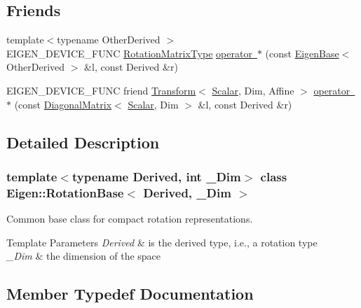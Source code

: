 \subsection*{Friends}
\begin{DoxyCompactItemize}
\item 
{\footnotesize template$<$typename Other\+Derived $>$ }\\E\+I\+G\+E\+N\+\_\+\+D\+E\+V\+I\+C\+E\+\_\+\+F\+U\+NC \mbox{\hyperlink{class_eigen_1_1_rotation_base_a83602509674c9d635551998460342951}{Rotation\+Matrix\+Type}} \mbox{\hyperlink{class_eigen_1_1_rotation_base_aa9a541f4a0b00b5463478c4973f7f112}{operator $\ast$}} (const \mbox{\hyperlink{struct_eigen_1_1_eigen_base}{Eigen\+Base}}$<$ Other\+Derived $>$ \&l, const Derived \&r)
\item 
E\+I\+G\+E\+N\+\_\+\+D\+E\+V\+I\+C\+E\+\_\+\+F\+U\+NC friend \mbox{\hyperlink{class_eigen_1_1_transform}{Transform}}$<$ \mbox{\hyperlink{class_eigen_1_1_rotation_base_af9b43eac462d7aa70b018efd49c13ef4}{Scalar}}, Dim, Affine $>$ \mbox{\hyperlink{class_eigen_1_1_rotation_base_a82017b7513e822b9adb8161abd1a9bbe}{operator $\ast$}} (const \mbox{\hyperlink{class_eigen_1_1_diagonal_matrix}{Diagonal\+Matrix}}$<$ \mbox{\hyperlink{class_eigen_1_1_rotation_base_af9b43eac462d7aa70b018efd49c13ef4}{Scalar}}, Dim $>$ \&l, const Derived \&r)
\end{DoxyCompactItemize}


\subsection{Detailed Description}
\subsubsection*{template$<$typename Derived, int \+\_\+\+Dim$>$\newline
class Eigen\+::\+Rotation\+Base$<$ Derived, \+\_\+\+Dim $>$}

Common base class for compact rotation representations. 


\begin{DoxyTemplParams}{Template Parameters}
{\em Derived} & is the derived type, i.\+e., a rotation type \\
\hline
{\em \+\_\+\+Dim} & the dimension of the space \\
\hline
\end{DoxyTemplParams}


\subsection{Member Typedef Documentation}
\mbox{\label{class_eigen_1_1_rotation_base_a83602509674c9d635551998460342951}} 
